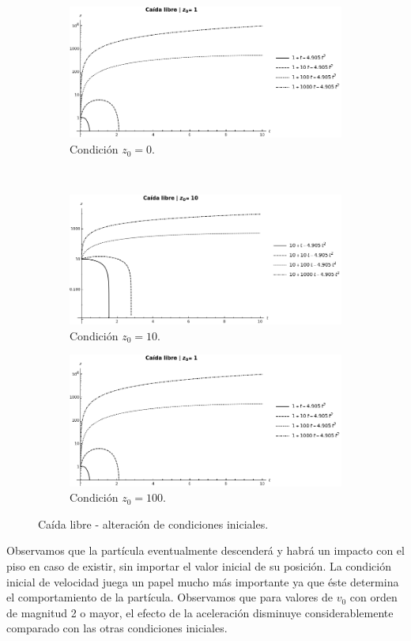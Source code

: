 \documentclass[letterpaper,12pt]{article}
\begin{document}
 
  \begin{figure}[h]
\begin{subfigure}{\textwidth}
  \centering
  \includegraphics[scale=0.4]{loggraph01.png}
  \caption{Condici\'on $z_0=0$.}
  \label{fig: a}
\end{subfigure}%
\\
\begin{subfigure}{\textwidth}
  \centering
  \includegraphics[scale=0.4]{loggraph02.png}
  \caption{Condici\'on $z_0=10$.}
  \label{fig: b}
\end{subfigure}
\begin{subfigure}{\textwidth}
  \centering
  \includegraphics[scale=0.4]{loggraph01.png}
  \caption{Condici\'on $z_0=100$.}
  \label{fig: c}
\end{subfigure}%
\caption{Ca\'ida libre - alteraci\'on de condiciones iniciales.}
\label{fig: free fall - initial condition matrix}
\end{figure}
 
Observamos que la part\'icula eventualmente descender\'a y habr\'a un impacto con el piso en caso de existir, sin importar el valor inicial de su posici\'on. La condici\'on inicial de velocidad juega un papel mucho m\'as importante ya que \'este determina el comportamiento de la part\'icula. Observamos que para valores de $v_0$ con orden de magnitud 2 o mayor, el efecto de la aceleraci\'on disminuye considerablemente comparado con las otras condiciones iniciales.
\end{document}

